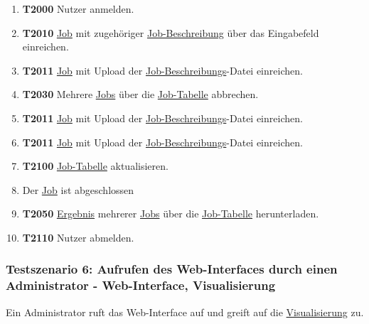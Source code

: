 \begin{enumerate}
     \item \textbf{T2000} \gls{Nutzer} anmelden.

     \item \textbf{T2010} \hyperref[B:Jobs]{Job} mit zugehöriger \hyperref[B:Job-Beschreibung]{Job-Beschreibung} über das Eingabefeld einreichen.
        
     \item \textbf{T2011} \hyperref[B:Jobs]{Job} mit Upload der \hyperref[B:Job-Beschreibung]{Job-Beschreibungs}-Datei einreichen.
     
     \item \textbf{T2030} Mehrere \hyperref[B:Jobs]{Jobs} über die \hyperref[pages:job-table]{Job-Tabelle} abbrechen.
     
     \item \textbf{T2011} \hyperref[B:Jobs]{Job} mit Upload der \hyperref[B:Job-Beschreibung]{Job-Beschreibungs}-Datei einreichen.
     
     \item \textbf{T2011} \hyperref[B:Jobs]{Job} mit Upload der \hyperref[B:Job-Beschreibung]{Job-Beschreibungs}-Datei einreichen.
     
     \item \textbf{T2100} \hyperref[pages:job-table]{Job-Tabelle} aktualisieren.
     
     \item Der \hyperref[B:Jobs]{Job} ist abgeschlossen
     
     \item \textbf{T2050} \hyperref[B:Job-Ergebnis]{Ergebnis} mehrerer \hyperref[B:Jobs]{Jobs} über die \hyperref[pages:job-table]{Job-Tabelle} herunterladen.
     
     \item \textbf{T2110} \gls{Nutzer} abmelden.
\end{enumerate}


\subsubsection{Testszenario 6: Aufrufen des Web-Interfaces durch einen Administrator - Web-Interface, Visualisierung}
Ein \gls{Administrator} ruft das \gls{Web-Interface} auf und greift auf die \hyperref[pages:visualization]{Visualisierung} zu.

